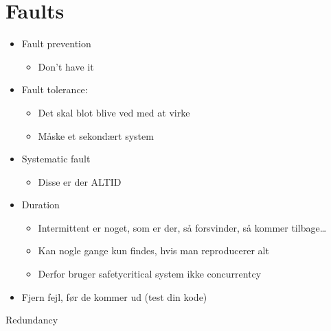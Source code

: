 \documentclass[a4, 10pt]{article}
\begin{document}
\newpage
\section*{Faults}

\begin{itemize}
	\item Fault prevention
	\begin{itemize}
		\item Don't have it
	\end{itemize}

	\item Fault tolerance:
	\begin{itemize}
		\item Det skal blot blive ved med at virke
		\item Måske et sekondært system
	\end{itemize}


	\item Systematic fault
	\begin{itemize}
		\item Disse er der ALTID
	\end{itemize}

	\item Duration
	\begin{itemize}
		\item Intermittent er noget, som er der, så forsvinder, så kommer tilbage\dots
		\item Kan nogle gange kun findes, hvis man reproducerer alt
		\item Derfor bruger safetycritical system ikke concurrentcy
	\end{itemize}

	\item Fjern fejl, før de kommer ud (test din kode)

\end{itemize}
Redundancy
\end{document}
